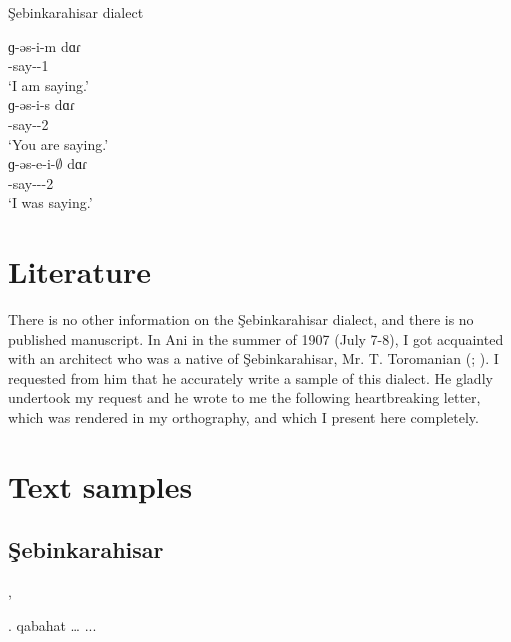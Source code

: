 \begin{exe}
	\ex Şebinkarahisar dialect\label{sent:Şebinkarahisar:morpho:verb:progReal}
	\begin{xlist}
		\ex\gll ɡ-əs-i-m dɑɾ \\
		{\ind}-say-{\thgloss}-1{\sg} {\prog} \\
		\trans `I am saying.' \\
		\ex\gll ɡ-əs-i-s dɑɾ \\
		{\ind}-say-{\thgloss}-2{\sg} {\prog} \\
		\trans `You are saying.' \\
		\ex\gll ɡ-əs-e-i-$\emptyset$ dɑɾ \\
		{\ind}-say-{\thgloss}-{\pst}-2{\sg} {\prog} \\
		\trans `I was saying.' \\
	\end{xlist}
\end{exe}

\section{Literature}

There is no other information on the Şebinkarahisar dialect, and there is no published manuscript. In Ani in the summer of 1907 (July 7-8), I got acquainted with an architect who was a native of Şebinkarahisar, Mr. T. Toromanian (; ). I requested from him that he accurately write a sample of this dialect. He gladly undertook my request and he wrote to me the following heartbreaking letter, which was rendered in my orthography, and which I present here completely.

\section{Text samples}

{\sampleoverview}

\subsection{Şebinkarahisar}

,

. qabahat … ... 



